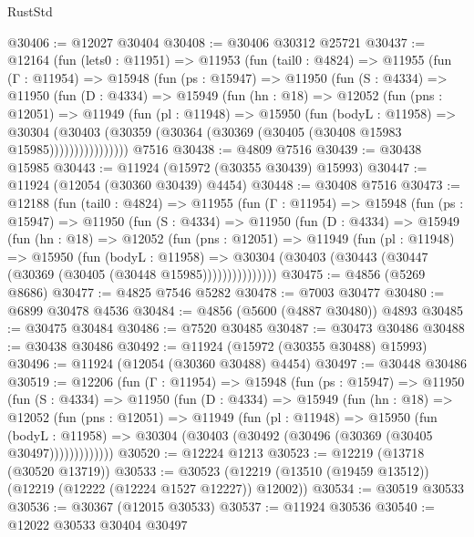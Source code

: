 \begin{lexlean}{RustStd}
\begin{coremodule}
@30406 := @12027 @30404
@30408 := @30406 @30312 @25721
@30437 := @12164
    (fun (lets0 : @11951) =>
    @11953
      (fun (tail0 : @4824) =>
      @11955
        (fun (Γ : @11954) =>
        @15948
          (fun (ps : @15947) =>
          @11950
            (fun (S : @4334) =>
            @11950
              (fun (D : @4334) =>
              @15949
                (fun (hn : @18) =>
                @12052
                  (fun (pns : @12051) =>
                  @11949
                    (fun (pl : @11948) =>
                    @15950
                      (fun (bodyL : @11958) =>
                      @30304
                        (@30403
                          (@30359 (@30364 (@30369 (@30405 (@30408 @15983 @15985))))))))))))))))
    @7516
@30438 := @4809 @7516
@30439 := @30438 @15985
@30443 := @11924 (@15972 (@30355 @30439) @15993)
@30447 := @11924 (@12054 (@30360 @30439) @4454)
@30448 := @30408 @7516
@30473 := @12188
    (fun (tail0 : @4824) =>
    @11955
      (fun (Γ : @11954) =>
      @15948
        (fun (ps : @15947) =>
        @11950
          (fun (S : @4334) =>
          @11950
            (fun (D : @4334) =>
            @15949
              (fun (hn : @18) =>
              @12052
                (fun (pns : @12051) =>
                @11949
                  (fun (pl : @11948) =>
                  @15950
                    (fun (bodyL : @11958) =>
                    @30304 (@30403 (@30443 (@30447 (@30369 (@30405 (@30448 @15985)))))))))))))))
@30475 := @4856 (@5269 @8686)
@30477 := @4825 @7546 @5282
@30478 := @7003 @30477
@30480 := @6899 @30478 @4536
@30484 := @4856 (@5600 (@4887 @30480)) @4893
@30485 := @30475 @30484
@30486 := @7520 @30485
@30487 := @30473 @30486
@30488 := @30438 @30486
@30492 := @11924 (@15972 (@30355 @30488) @15993)
@30496 := @11924 (@12054 (@30360 @30488) @4454)
@30497 := @30448 @30486
@30519 := @12206
    (fun (Γ : @11954) =>
    @15948
      (fun (ps : @15947) =>
      @11950
        (fun (S : @4334) =>
        @11950
          (fun (D : @4334) =>
          @15949
            (fun (hn : @18) =>
            @12052
              (fun (pns : @12051) =>
              @11949
                (fun (pl : @11948) =>
                @15950
                  (fun (bodyL : @11958) =>
                  @30304 (@30403 (@30492 (@30496 (@30369 (@30405 @30497)))))))))))))
@30520 := @12224 @1213
@30523 := @12219 (@13718 (@30520 @13719))
@30533 := @30523 (@12219 (@13510 (@19459 @13512)) (@12219 (@12222 (@12224 @1527 @12227)) @12002))
@30534 := @30519 @30533
@30536 := @30367 (@12015 @30533)
@30537 := @11924 @30536
@30540 := @12022 @30533 @30404 @30497

\end{coremodule}
\end{lexlean}
